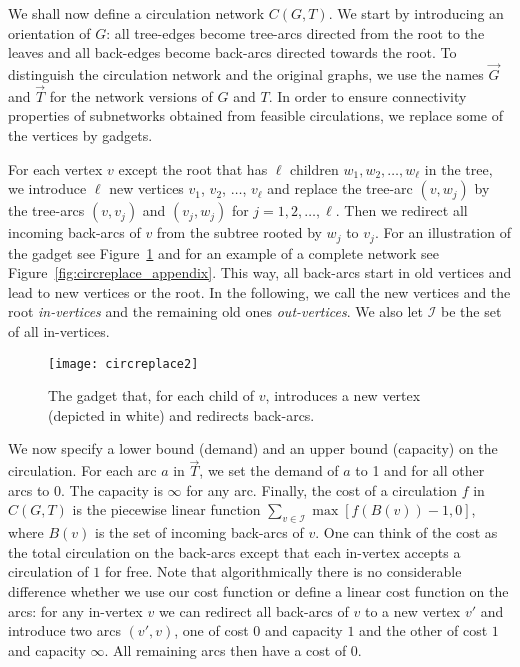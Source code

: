\documentclass[letterpaper,11pt]{article}
\newcommand{\oa}[1]{\ensuremath{\overrightarrow{#1}}}
\begin{document}
We shall now define a circulation network $C(G,T)$.
We start
by introducing an orientation of $G$: all tree-edges
become tree-arcs directed from the root to the leaves and all 
back-edges become back-arcs directed towards the root. To distinguish the circulation
network and the original graphs, we use the names $\oa{G}$ and $\oa{T}$ for the
network versions of $G$ and $T$.  In order to ensure connectivity properties of
subnetworks obtained from feasible circulations, we replace some of the vertices
by gadgets. 

For each vertex $v$ except the root that has $\ell$ children $w_1,
w_2, \ldots, w_\ell$ in the tree, we introduce $\ell$ new vertices $v_1$,
$v_2$, $\ldots$, $v_\ell$ and replace the tree-arc $(v, w_j)$ by the tree-arcs $(v,v_j)$ and $(v_j, w_j)$ for $j= 1,2, \ldots, \ell$. 
Then we redirect all incoming back-arcs of $v$ from the subtree rooted
by $w_j$ to $v_j$. For an illustration of the gadget see
Figure~\ref{fig:circreplace} and for an example of a complete network
see Figure~\ref{fig:circreplace_appendix}.  This way,
all back-arcs start in old vertices and lead to new vertices or the
root.  In the following, we call the new vertices and the root
\emph{in-vertices} and the remaining old ones \emph{out-vertices}. We
also let $\mathcal{I}$ be the set of all in-vertices.

\begin{figure}[bt]
\begin{center}
  \texttt{[image: circreplace2]}
\end{center}
\caption{The gadget that, for each child of $v$, introduces a new vertex (depicted in
  white) and redirects back-arcs.}
\label{fig:circreplace}
\end{figure}


We now specify
a lower bound (demand) and an upper bound (capacity) on the circulation.
For each arc $a$ in $\oa{T}$, we set the demand of $a$ to 1 and for
all other arcs to
0.
The capacity is $\infty$ for any arc.  Finally, the cost of a circulation $f$
in $C(G,T)$ is the piecewise linear function $\sum_{v\in\mathcal{I}}
\max[f(B(v))-1, 0]$, where $B(v)$ is the set of incoming back-arcs of
$v$. One can think of the cost as the total circulation on the
back-arcs except that each in-vertex accepts a circulation of $1$ for
free.  Note that algorithmically there is no considerable difference
whether we use our cost function or define a linear cost function on
the arcs: for any in-vertex $v$ we can redirect all back-arcs of $v$
to a new vertex $v'$ and introduce two arcs $(v',v)$, one of cost $0$
and capacity $1$ and the other  of cost $1$ and capacity $\infty$. All
remaining arcs then have a cost of $0$.
\end{document}
